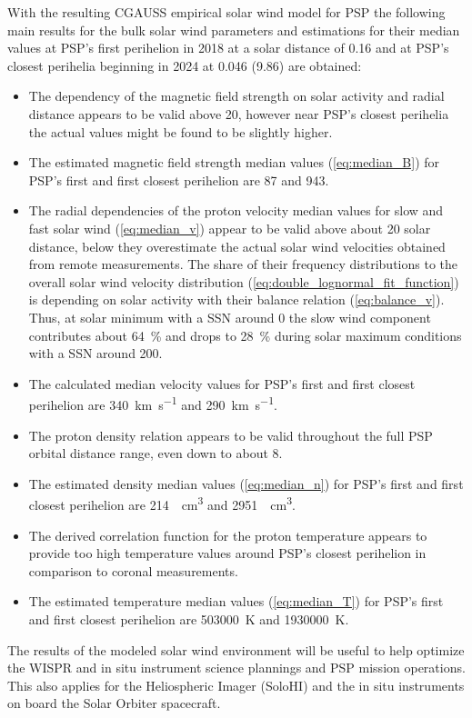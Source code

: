 With the resulting CGAUSS empirical solar wind model for PSP the following main results for the bulk solar wind parameters and estimations for their median values at PSP’s first perihelion in 2018 at a solar distance of \SI{0.16}{\au} and at PSP’s closest perihelia beginning in 2024 at \SI{0.046}{\au} (\SI{9.86}{\Rs}) are obtained:
\begin{itemize}
	\item The dependency of the magnetic field strength on solar activity and radial distance appears to be valid above \SI{20}{\Rs}, however near PSP's closest perihelia the actual values might be found to be slightly higher.
	\item The estimated magnetic field strength median values (\ref{eq:median_B}) for PSP's first and first closest perihelion are \SI{87}{\nT} and \SI{943}{\nT}.
	\item The radial dependencies of the proton velocity median values for slow and fast solar wind (\ref{eq:median_v}) appear to be valid above about \SI{20}{\Rs} solar distance, below they overestimate the actual solar wind velocities obtained from remote measurements. The share of their frequency distributions to the overall solar wind velocity distribution (\ref{eq:double_lognormal_fit_function}) is depending on solar activity with their balance relation (\ref{eq:balance_v}). Thus, at solar minimum with a SSN around 0 the slow wind component contributes about \SI{64}{\%} and drops to \SI{28}{\%} during solar maximum conditions with a SSN around 200.
	\item The calculated median velocity values for PSP's first and first closest perihelion are \SI{340}{\km\per\s} and \SI{290}{\km\per\s}.
	\item The proton density relation appears to be valid throughout the full PSP orbital distance range, even down to about \SI{8}{\Rs}.
	\item The estimated density median values (\ref{eq:median_n}) for PSP's first and first closest perihelion are \SI{214}{\per\cm\cubed} and \SI{2951}{\per\cm\cubed}.
	\item The derived correlation function for the proton temperature appears to provide too high temperature values around PSP’s closest perihelion in comparison to coronal measurements.
	\item The estimated temperature median values (\ref{eq:median_T}) for PSP's first and first closest perihelion are \SI{503000}{\K} and \SI{1930000}{\K}.
\end{itemize}

The results of the modeled solar wind environment will be useful to help optimize the WISPR and in situ instrument science plannings and PSP mission operations. This also applies for the Heliospheric Imager (SoloHI) \citep{Howard2013} and the in situ instruments on board the Solar Orbiter spacecraft.

